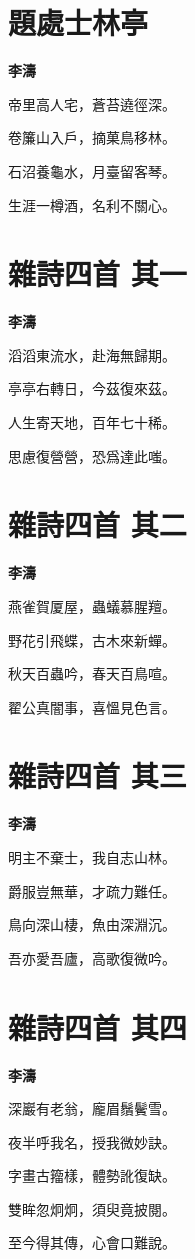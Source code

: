 \documentclass[12pt,a4paper]{ctexbook}
\begin{document}
\section{題處士林亭}
\textbf{李濤}\par\vspace{0.5em}
帝里高人宅，蒼苔遶徑深。\par
卷簾山入戶，摘菓鳥移林。\par
石沼養龜水，月臺留客琴。\par
生涯一樽酒，名利不關心。\par

\section{雜詩四首  其一}
\textbf{李濤}\par\vspace{0.5em}
滔滔東流水，赴海無歸期。\par
亭亭右轉日，今茲復來茲。\par
人生寄天地，百年七十稀。\par
思慮復營營，恐爲達此嗤。\par

\section{雜詩四首  其二}
\textbf{李濤}\par\vspace{0.5em}
燕雀賀厦屋，蟲蟻慕腥羶。\par
野花引飛蝶，古木來新蟬。\par
秋天百蟲吟，春天百鳥喧。\par
翟公真闇事，喜慍見色言。\par

\section{雜詩四首  其三}
\textbf{李濤}\par\vspace{0.5em}
明主不棄士，我自志山林。\par
爵服豈無華，才疏力難任。\par
鳥向深山棲，魚由深淵沉。\par
吾亦愛吾廬，高歌復微吟。\par

\section{雜詩四首  其四}
\textbf{李濤}\par\vspace{0.5em}
深巖有老翁，龐眉鬚鬢雪。\par
夜半呼我名，授我微妙訣。\par
字畫古籀樣，體勢訛復缺。\par
雙眸忽炯炯，須臾竟披閱。\par
至今得其傳，心會口難說。\par
\end{document}
